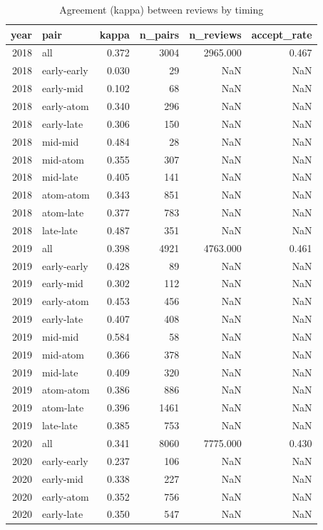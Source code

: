 \begin{table}
\caption{Agreement (kappa) between reviews by timing}
\label{tab:kappa_pairs}
\begin{tabular}{rlrrrr}
\toprule
year & pair & kappa & n\_pairs & n\_reviews & accept\_rate \\
\midrule
2018 & all & 0.372 & 3004 & 2965.000 & 0.467 \\
2018 & early-early & 0.030 & 29 & NaN & NaN \\
2018 & early-mid & 0.102 & 68 & NaN & NaN \\
2018 & early-atom & 0.340 & 296 & NaN & NaN \\
2018 & early-late & 0.306 & 150 & NaN & NaN \\
2018 & mid-mid & 0.484 & 28 & NaN & NaN \\
2018 & mid-atom & 0.355 & 307 & NaN & NaN \\
2018 & mid-late & 0.405 & 141 & NaN & NaN \\
2018 & atom-atom & 0.343 & 851 & NaN & NaN \\
2018 & atom-late & 0.377 & 783 & NaN & NaN \\
2018 & late-late & 0.487 & 351 & NaN & NaN \\
2019 & all & 0.398 & 4921 & 4763.000 & 0.461 \\
2019 & early-early & 0.428 & 89 & NaN & NaN \\
2019 & early-mid & 0.302 & 112 & NaN & NaN \\
2019 & early-atom & 0.453 & 456 & NaN & NaN \\
2019 & early-late & 0.407 & 408 & NaN & NaN \\
2019 & mid-mid & 0.584 & 58 & NaN & NaN \\
2019 & mid-atom & 0.366 & 378 & NaN & NaN \\
2019 & mid-late & 0.409 & 320 & NaN & NaN \\
2019 & atom-atom & 0.386 & 886 & NaN & NaN \\
2019 & atom-late & 0.396 & 1461 & NaN & NaN \\
2019 & late-late & 0.385 & 753 & NaN & NaN \\
2020 & all & 0.341 & 8060 & 7775.000 & 0.430 \\
2020 & early-early & 0.237 & 106 & NaN & NaN \\
2020 & early-mid & 0.338 & 227 & NaN & NaN \\
2020 & early-atom & 0.352 & 756 & NaN & NaN \\
2020 & early-late & 0.350 & 547 & NaN & NaN \\

\end{tabular}
\end{table}
